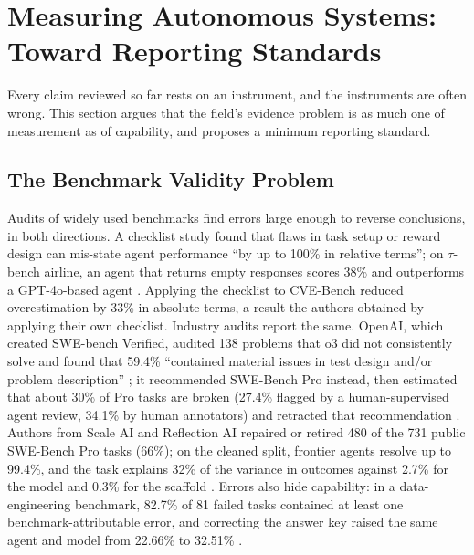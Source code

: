 \section{Measuring Autonomous Systems: Toward Reporting Standards}\label{sec:measurement}

Every claim reviewed so far rests on an instrument, and the instruments are often wrong. This section argues that the field's evidence problem is as much one of measurement as of capability, and proposes a minimum reporting standard.

\subsection{The Benchmark Validity Problem}

Audits of widely used benchmarks find errors large enough to reverse conclusions, in both directions. A checklist study found that flaws in task setup or reward design can mis-state agent performance ``by up to 100\% in relative terms''; on $\tau$-bench airline, an agent that returns empty responses scores 38\% and outperforms a GPT-4o-based agent \citep{A18}. Applying the checklist to CVE-Bench reduced overestimation by 33\% in absolute terms, a result the authors obtained by applying their own checklist. Industry audits report the same. OpenAI, which created SWE-bench Verified, audited 138 problems that o3 did not consistently solve and found that 59.4\% ``contained material issues in test design and/or problem description'' \citep{C15}; it recommended SWE-Bench Pro instead, then estimated that about 30\% of Pro tasks are broken (27.4\% flagged by a human-supervised agent review, 34.1\% by human annotators) and retracted that recommendation \citep{V31}. Authors from Scale AI and Reflection AI repaired or retired 480 of the 731 public SWE-Bench Pro tasks (66\%); on the cleaned split, frontier agents resolve up to 99.4\%, and the task explains 32\% of the variance in outcomes against 2.7\% for the model and 0.3\% for the scaffold \citep{C12}. Errors also hide capability: in a data-engineering benchmark, 82.7\% of 81 failed tasks contained at least one benchmark-attributable error, and correcting the answer key raised the same agent and model from 22.66\% to 32.51\% \citep{D13}.

